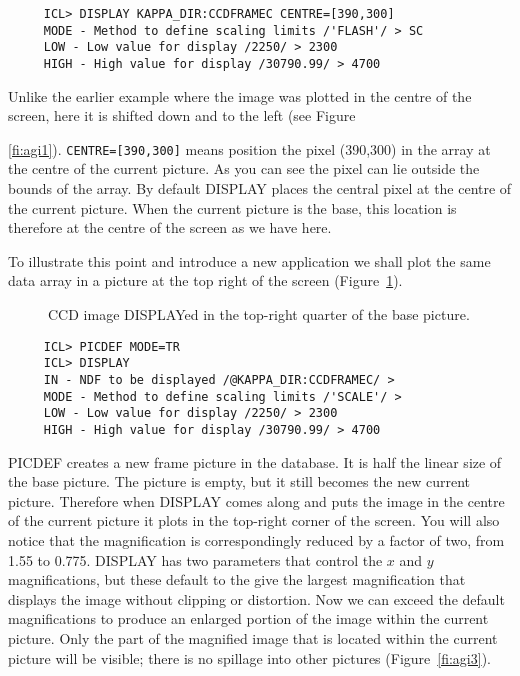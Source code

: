 \small
\begin{verbatim}
     ICL> DISPLAY KAPPA_DIR:CCDFRAMEC CENTRE=[390,300]
     MODE - Method to define scaling limits /'FLASH'/ > SC
     LOW - Low value for display /2250/ > 2300
     HIGH - High value for display /30790.99/ > 4700
\end{verbatim}
\normalsize
Unlike the earlier example where the image was plotted in the centre of the
screen, here it is shifted down and to the left (see Figure~{\ref{fi:agi1}).
{\tt CENTRE=[390,300]} means position the pixel (390,300) in the array
at the centre of the current picture. As you can see the pixel can lie
outside the bounds of the array. By default DISPLAY places the
central pixel at the centre of the current picture.  When the current
picture is the base, this location is therefore at the centre of the
screen as we have here.

To illustrate this point and introduce a new application we shall plot
the same data array in a picture at the top right of the screen
(Figure~\ref{fi:agi2}).
\begin{figure}[hbt]
\caption{CCD image DISPLAYed in the top-right quarter of the base picture.}
\label{fi:agi2}
\vspace{4.4in}
\end{figure}

\small
\begin{verbatim}
     ICL> PICDEF MODE=TR
     ICL> DISPLAY
     IN - NDF to be displayed /@KAPPA_DIR:CCDFRAMEC/ >
     MODE - Method to define scaling limits /'SCALE'/ >
     LOW - Low value for display /2250/ > 2300
     HIGH - High value for display /30790.99/ > 4700
\end{verbatim}
\normalsize
PICDEF creates a new frame picture in the database.  It is half the linear
size of the base picture. The picture is empty, but it still becomes the
new current picture. Therefore when DISPLAY comes along and puts the
image in the centre of the current picture it plots in the top-right
corner of the screen.  You will also notice that the magnification is
correspondingly reduced by a factor of two, from 1.55 to 0.775.  DISPLAY
has two parameters that control the $x$ and $y$ magnifications, but
these default to the give the largest magnification that displays the
image without clipping or distortion.  Now we can exceed the default
magnifications to produce an enlarged portion of the image
within the current picture.  Only the part of the magnified image that
is located within the current picture will be visible; there is no
spillage into other pictures (Figure~\ref{fi:agi3}).

}
